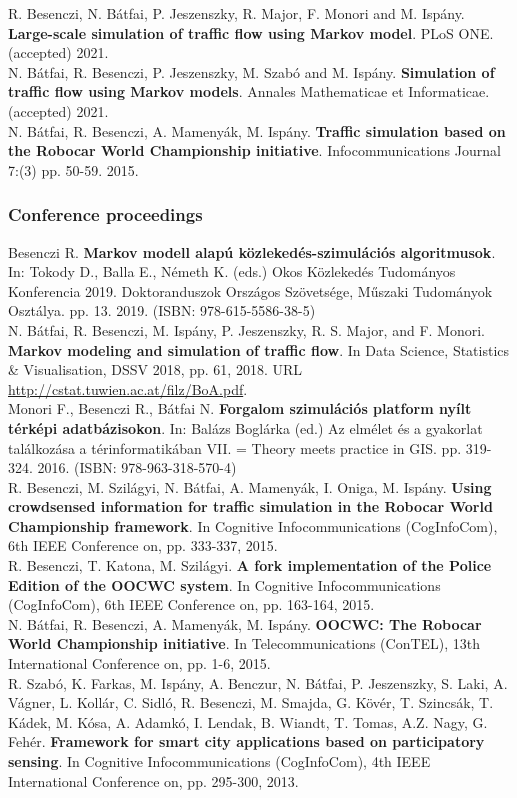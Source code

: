 \documentclass[b5paper,12pt]{report}
\theoremstyle{definition}
\begin{document}
\begin{singlespace}
\small
\noindent
R. Besenczi, N. Bátfai, P. Jeszenszky, R. Major, F. Monori and M. Ispány. {\bf{Large-scale simulation of traffic flow using Markov model}}. PLoS ONE. (accepted) 2021.
\\[10pt]
\noindent
N. Bátfai, R. Besenczi, P. Jeszenszky, M. Szabó and M. Ispány. {\bf{Simulation of traffic flow using Markov models}}. Annales Mathematicae et Informaticae. (accepted) 2021.
\\[10pt]
\noindent
N. Bátfai, R. Besenczi, A. Mamenyák, M. Ispány. {\bf{Traffic simulation based on the Robocar World Championship initiative}}. Infocommunications Journal 7:(3) pp. 50-59. 2015.

\subsubsection*{Conference proceedings}

\noindent
Besenczi R. {\bf{Markov modell alapú közlekedés-szimulációs algoritmusok}}. In: Tokody D., Balla E., Németh K. (eds.) Okos Közlekedés Tudományos Konferencia 2019. Doktoranduszok Országos Szövetsége, Műszaki Tudományok Osztálya. pp. 13. 2019. (ISBN: 978-615-5586-38-5)
\\[10pt]
\noindent
N. Bátfai, R. Besenczi, M. Ispány, P. Jeszenszky, R. S. Major, and F. Monori. {\bf{Markov modeling and simulation of traffic flow}}. In Data Science, Statistics \& Visualisation, DSSV 2018, pp. 61, 2018. URL \url{http://cstat.tuwien.ac.at/filz/BoA.pdf}.
\\[10pt]
\noindent
Monori F., Besenczi R., Bátfai N. {\bf{Forgalom szimulációs platform nyílt térképi adatbázisokon}}. In: Balázs Boglárka (ed.) Az elmélet és a gyakorlat találkozása a térinformatikában VII. = Theory meets practice in GIS. pp. 319-324. 2016. (ISBN: 978-963-318-570-4)
\\[10pt]
\noindent
R. Besenczi, M. Szilágyi, N. Bátfai, A. Mamenyák, I. Oniga, M. Ispány. {\bf{Using crowdsensed information for traffic simulation in the Robocar World Championship framework}}. In Cognitive Infocommunications (CogInfoCom), 6th IEEE Conference on, pp. 333-337, 2015.
\\[10pt]
\noindent
R. Besenczi, T. Katona, M. Szilágyi. {\bf{A fork implementation of the Police Edition of the OOCWC system}}. In Cognitive Infocommunications (CogInfoCom), 6th IEEE Conference on, pp. 163-164, 2015.
\\[10pt]
\noindent
N. Bátfai, R. Besenczi, A. Mamenyák, M. Ispány. {\bf{OOCWC: The Robocar World Championship initiative}}. In Telecommunications (ConTEL), 13th International Conference on, pp. 1-6, 2015.
\\[10pt]
\noindent
R. Szabó, K. Farkas, M. Ispány, A. Benczur, N. Bátfai, P. Jeszenszky, S. Laki, A. Vágner, L. Kollár, C. Sidló, R. Besenczi, M. Smajda, G. Kövér, T. Szincsák, T. Kádek, M. Kósa, A. Adamkó, I. Lendak, B. Wiandt, T. Tomas, A.Z. Nagy, G. Fehér. {\bf{Framework for smart city applications based on participatory sensing}}. In Cognitive Infocommunications (CogInfoCom), 4th IEEE International Conference on, pp. 295-300, 2013.


\end{singlespace}
\end{document}

